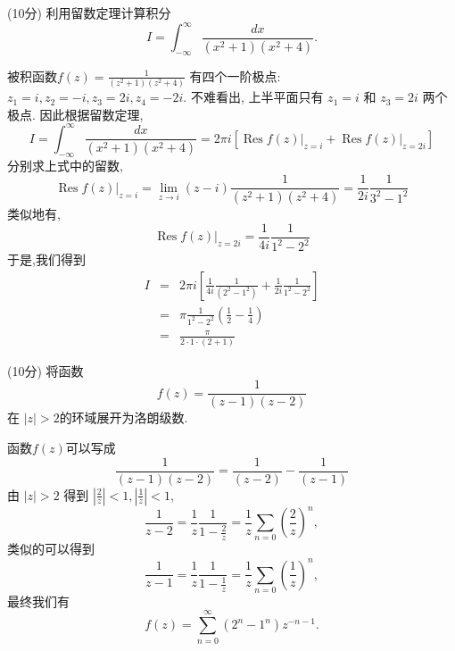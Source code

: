 \documentclass{njustexam}
\begin{document}



\begin{problem}{(10分)}
  利用留数定理计算积分 
  $$I = \int_{-\infty}^{\infty} \frac{d x}{(x^2 + 1)(x^2+4)}. $$
  \end{problem}
  \vspace{1em}
  \begin{solution}
  被积函数$f(z) =\frac{1}{(z^2+1)(z^2+4)}$ 有四个一阶极点: 
  $z_1=i, z_2=-i, z_3=2i, z_4=-2i$. 
  不难看出, 上半平面只有 $z_1=i$ 和 $z_3=2i$ 两个极点. 
  因此根据留数定理,
  $$
  I=\int_{-\infty}^{\infty} \frac{d x}{(x^2+1)(x^2+4)}=
  2 \pi i\left[\left.\operatorname{Res} f(z)\right|_{z=i}+\left.\operatorname{Res} f(z)\right|_{z=2i}\right]
  $$
  分别求上式中的留数, 
  $$ 
  \left.\operatorname{Res} f(z)\right|_{z=i}=\lim _{z \rightarrow i}(z-i) \frac{1}{(z^2+1)(z^2+4)}=\frac{1}{2 i} \frac{1}{3^2-1^2} 
  $$ 
  类似地有,
  $$\left.\operatorname{Res} f(z)\right|_{z=2i}=\frac{1}{4 i} \frac{1}{1^2-2^2}$$ 
  于是,我们得到
  \begin{eqnarray*}
    I &=&2 \pi i\left[\frac{1}{4 i} \frac{1}{(2^2-1^2)}+\frac{1}{2 i} \frac{1}{1^2-2^2}\right]   \\
    &=&\pi \frac{1}{1^2-2^2}\left(\frac{1}{2}-\frac{1}{4}\right) \\
    &=&\frac{\pi}{2 \cdot 1 \cdot (2+1)}  \text{ }
  \end{eqnarray*} 
  \end{solution}



  \begin{problem}{(10分)}
    将函数$$f(z) = \frac{1}{(z-1)(z-2)}$$ 
    在 $|z|>2$的环域展开为洛朗级数. 
    \end{problem}
    \vfill
    \begin{solution}
    函数$f(z)$可以写成
    $$
    \frac{1}{(z-1)(z-2)}=\frac{1}{(z-2)}-\frac{1}{(z-1)} 
    $$
    由 $|z|>2$ 得到 $\left|\frac{2}{z}\right|<1, \left|\frac{1}{z}\right|<1$,  
    $$
    \frac{1}{z-2} = \frac{1}{z} \frac{1}{1-\frac{2}{z}} = \frac{1}{z} \sum_{n=0} \left(\frac{2}{z}\right)^n,  
    $$
    类似的可以得到 
    $$\frac{1}{z-1} = \frac{1}{z} \frac{1}{1-\frac{1}{z}} = \frac{1}{z} \sum_{n=0} \left(\frac{1}{z}\right)^n,  
    $$
    最终我们有 
    $$f(z) = \sum_{n=0}^{\infty}\left(2^n-1^n\right) z^{-n-1}.  $$
    \end{solution}
\end{document}
